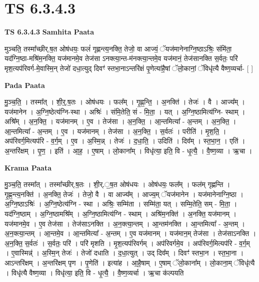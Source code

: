 \documentclass[17pt]{extarticle}
\begin{document}
\section{ TS 6.3.4.3 }

\textbf{TS 6.3.4.3 } \newline
\textbf{Samhita Paata} \newline

मुञ्चति॒ तस्मा᳚च्छीर्.ष॒त ओष॑धयः॒ फलं॑ गृह्णन्त्य॒नक्ति॒ तेजो॒ वा आज्यं॒ ॅयज॑मानेनाग्नि॒ष्ठाऽश्रिः॒ संमि॑ता॒ यद॑ग्नि॒ष्ठा-मश्रि॑म॒नक्ति॒ यज॑मानमे॒व तेज॑सा ऽनक्त्या॒न्त-म॑नक्त्या॒न्तमे॒व यज॑मानं॒ तेज॑सानक्ति स॒र्वतः॒ परि॑ मृश॒त्यप॑रिवर्ग-मे॒वास्मि॒न् तेजो॑ दधा॒त्युद् दिवꣳ॑ स्तभा॒नाऽन्तरि॑क्षं पृ॒णेत्या॑है॒षां ॅलो॒कानां॒ ॅविधृ॑त्यै वैष्ण॒व्यर्चा- [  ] \newline

\textbf{Pada Paata} \newline

मु॒ञ्च॒ति॒ । तस्मा᳚त् । शी॒र्॒.ष॒तः । ओष॑धयः । फल᳚म् । गृ॒ह्ण॒न्ति॒ । अ॒नक्ति॑ । तेजः॑ । वै । आज्य᳚म् । यज॑मानेन । अ॒ग्नि॒ष्ठेत्य॑ग्नि-स्था । अश्रिः॑ । संमि॒तेति॒ सं - मि॒ता॒ । यत् । अ॒ग्नि॒ष्ठामित्य॑ग्नि- स्थाम् । अश्रि᳚म् । अ॒न॒क्ति॒ । यज॑मानम् । ए॒व । तेज॑सा । अ॒न॒क्ति॒ । आ॒न्तमित्या᳚ - अ॒न्तम् । अ॒न॒क्ति॒ । आ॒न्तमित्या᳚ - अ॒न्तम् । ए॒व । यज॑मानम् । तेज॑सा । अ॒न॒क्ति॒ । स॒र्वतः॑ । परीति॑ । मृ॒श॒ति॒ । अप॑रिवर्ग॒मित्यप॑रि - व॒र्ग॒म् । ए॒व । अ॒स्मि॒न्न् । तेजः॑ । द॒धा॒ति॒ । उदिति॑ । दिव᳚म् । स्त॒भा॒न॒ । एति॑ । अ॒न्तरि॑क्षम् । पृ॒ण॒ । इति॑ । आ॒ह॒ । ए॒षाम् । लो॒काना᳚म् । विधृ॑त्या॒ इति॒ वि - धृ॒त्यै॒ । वै॒ष्ण॒व्या । ऋ॒चा ।  \newline


\textbf{Krama Paata} \newline

मु॒ञ्च॒ति॒ तस्मा᳚त् । तस्मा᳚च्छीर्.ष॒तः । शी॒र्.॒ष॒त ओष॑धयः । ओष॑धयः॒ फल᳚म् । फल॑म् गृह्णन्ति । गृ॒ह्ण॒न्त्य॒नक्ति॑ । अ॒नक्ति॒ तेजः॑ । तेजो॒ वै । वा आज्य᳚म् । आज्य॒म् ॅयज॑मानेन । यज॑मानेनाग्नि॒ष्ठा । अ॒ग्नि॒ष्ठाऽश्रिः॑ । अ॒ग्नि॒ष्ठेत्य॑ग्नि - स्था । अश्रिः॒ सम्मि॑ता । सम्मि॑ता॒ यत् । सम्मि॒तेति॒ सम् - मि॒ता॒ । यद॑ग्नि॒ष्ठाम् । अ॒ग्नि॒ष्ठामश्रि᳚म् । अ॒ग्नि॒ष्ठामित्य॑ग्नि - स्थाम् । अश्रि॑म॒नक्ति॑ । अ॒नक्ति॒ यज॑मानम् । यज॑मानमे॒व । ए॒व तेज॑सा । तेज॑साऽनक्ति । अ॒न॒क्त्या॒न्तम् । आ॒न्तम॑नक्ति । आ॒न्तमित्या᳚ - अ॒न्तम् । अ॒न॒क्त्या॒न्तम् । आ॒न्तमे॒व । आ॒न्तमित्या᳚ - अ॒न्तम् । ए॒व यज॑मानम् । यज॑मान॒म् तेज॑सा । तेज॑साऽनक्ति । अ॒न॒क्ति॒ स॒र्वतः॑ । स॒र्वतः॒ परि॑ । परि॑ मृशति । मृ॒श॒त्यप॑रिवर्गम् । अप॑रिवर्गमे॒व । अप॑रिवर्ग॒मित्यप॑रि - व॒र्ग॒म् । ए॒वास्मिन्न्॑ । अ॒स्मि॒न् तेजः॑ । तेजो॑ दधाति । द॒धा॒त्युत् । उद् दिव᳚म् । दिवꣳ॑ स्तभा॒न । स्त॒भा॒ना । आऽन्तरि॑क्षम् । अ॒न्तरि॑क्षम् पृण । पृ॒णेति॑ । इत्या॑ह । आ॒है॒षाम् । ए॒षाम् ॅलो॒काना᳚म् । लो॒काना॒म् ॅविधृ॑त्यै । विधृ॑त्यै वैष्ण॒व्या । विधृ॑त्या॒ इति॒ वि - धृ॒त्यै॒ । वै॒ष्ण॒व्यर्चा । ऋ॒चा क॑ल्पयति \newline
\end{document}
